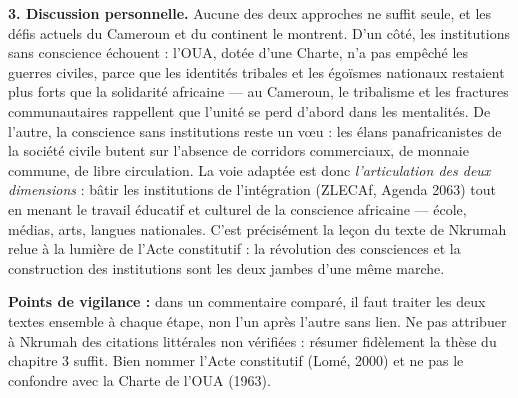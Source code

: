 \documentclass[11pt]{article}
\begin{document}
\begin{corrige}
\textbf{3. Discussion personnelle.} Aucune des deux approches ne suffit seule, et les défis actuels du Cameroun et du continent le montrent. D'un côté, les institutions sans conscience échouent : l'OUA, dotée d'une Charte, n'a pas empêché les guerres civiles, parce que les identités tribales et les égoïsmes nationaux restaient plus forts que la solidarité africaine — au Cameroun, le tribalisme et les fractures communautaires rappellent que l'unité se perd d'abord dans les mentalités. De l'autre, la conscience sans institutions reste un vœu : les élans panafricanistes de la société civile butent sur l'absence de corridors commerciaux, de monnaie commune, de libre circulation. La voie adaptée est donc \emph{l'articulation des deux dimensions} : bâtir les institutions de l'intégration (ZLECAf, Agenda 2063) tout en menant le travail éducatif et culturel de la conscience africaine — école, médias, arts, langues nationales. C'est précisément la leçon du texte de Nkrumah relue à la lumière de l'Acte constitutif : la révolution des consciences et la construction des institutions sont les deux jambes d'une même marche.

\textbf{Points de vigilance :} dans un commentaire comparé, il faut traiter les deux textes ensemble à chaque étape, non l'un après l'autre sans lien. Ne pas attribuer à Nkrumah des citations littérales non vérifiées : résumer fidèlement la thèse du chapitre 3 suffit. Bien nommer l'Acte constitutif (Lomé, 2000) et ne pas le confondre avec la Charte de l'OUA (1963).
\end{corrige}
\end{document}
